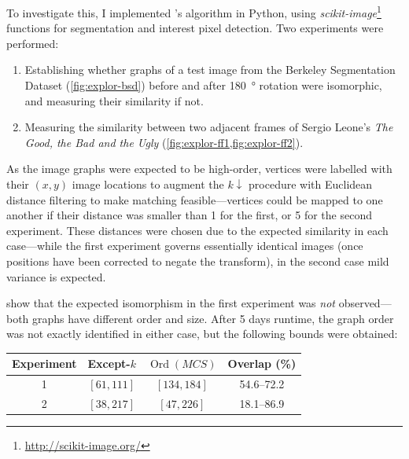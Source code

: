 \documentclass{mpaper}
\begin{document}
To investigate this, I implemented \citeauthor{Plane-Graphs-From-Images}'s algorithm in Python, using \textit{scikit-image}\footnote{\url{http://scikit-image.org/}} functions for segmentation and interest pixel detection.
Two experiments were performed:
\begin{enumerate}
	\item Establishing whether graphs of a test image from the Berkeley Segmentation Dataset \cite{BerkeleyDatabase} (\cref{fig:explor-bsd}) before and after \SI{180}{\degree} rotation were isomorphic, and measuring their similarity if not.
	\item Measuring the similarity between two adjacent frames of Sergio Leone's \emph{The Good, the Bad and the Ugly} (\cref{fig:explor-ff1,fig:explor-ff2}).
\end{enumerate}
As the image graphs were expected to be high-order, vertices were labelled with their $(x,y)$ image locations to augment the $k\downarrow$ procedure with Euclidean distance filtering to make matching feasible---vertices could be mapped to one another if their distance was smaller than 1 for the first, or 5 for the second experiment.
These distances were chosen due to the expected similarity in each case---while the first experiment governs essentially identical images (once positions have been corrected to negate the transform), in the second case mild variance is expected.

 show that the expected isomorphism in the first experiment was \emph{not} observed---both graphs have different order and size.
After 5 days runtime, the graph order was not exactly identified in either case, but the following bounds were obtained:

\begin{table}[h]
\centering
\begin{tabular}{cccc}
	\toprule
	Experiment & Except-$k$ & $\operatorname{Ord}(\mathit{MCS})$ & Overlap (\si{\percent}) \\ \midrule
	1 & $[61, 111]$ & $[134, 184]$ & 54.6--72.2 \\
	2 & $[38, 217]$ & $[47, 226]$ & 18.1--86.9 \\
	\bottomrule
\end{tabular}
\end{table}
\end{document}
